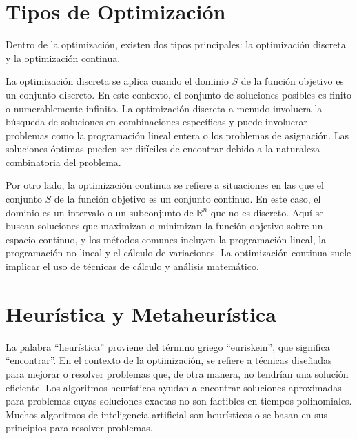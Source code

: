 \documentclass[12pt,titlepage,twoside,openright]{book}
\begin{document}
\section{Tipos de Optimizaci\'on}

Dentro de la optimizaci\'on, existen dos tipos principales: la optimizaci\'on discreta y la optimizaci\'on continua.

La optimizaci\'on discreta se aplica cuando el dominio \( S \) de la funci\'on objetivo es un conjunto discreto. En este contexto, el conjunto de soluciones posibles es finito o numerablemente infinito. La optimizaci\'on discreta a menudo involucra la b\'usqueda de soluciones en combinaciones espec\'ificas y puede involucrar problemas como la programaci\'on lineal entera o los problemas de asignaci\'on. Las soluciones \'optimas pueden ser dif\'iciles de encontrar debido a la naturaleza combinatoria del problema.

Por otro lado, la optimizaci\'on continua se refiere a situaciones en las que el conjunto \( S \) de la funci\'on objetivo es un conjunto continuo. En este caso, el dominio es un intervalo o un subconjunto de \( \mathbb{R}^n \) que no es discreto. Aqu\'i se buscan soluciones que maximizan o minimizan la funci\'on objetivo sobre un espacio continuo, y los m\'etodos comunes incluyen la programaci\'on lineal, la programaci\'on no lineal y el c\'alculo de variaciones. La optimizaci\'on continua suele implicar el uso de t\'ecnicas de c\'alculo y an\'alisis matem\'atico.



\section{Heur\'istica y Metaheur\'istica}

La palabra ``heur\'istica'' proviene del t\'ermino griego ``euriskein'', que significa ``encontrar''.
En el contexto de la optimizaci\'on, se refiere a t\'ecnicas dise\~nadas para mejorar o resolver problemas que, de otra manera, no tendr\'ian una soluci\'on eficiente. Los algoritmos heur\'isticos ayudan a encontrar soluciones aproximadas para problemas cuyas soluciones exactas no son factibles en tiempos polinomiales.
Muchos algoritmos de inteligencia artificial son heur\'isticos o se basan en sus principios para resolver problemas.
\end{document}
